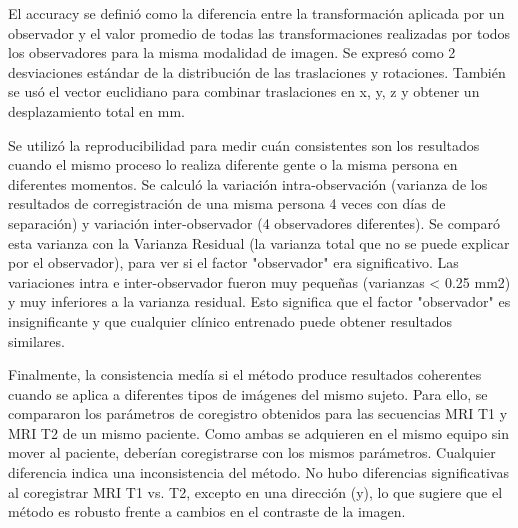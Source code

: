 El accuracy se definió como la diferencia entre la transformación aplicada por un observador y el valor promedio de todas las transformaciones realizadas por todos los observadores para la misma modalidad de imagen.
Se expresó como 2 desviaciones estándar de la distribución de las traslaciones y rotaciones. También se usó el vector euclidiano para combinar traslaciones en x, y, z y obtener un desplazamiento total en mm.

Se utilizó la reproducibilidad para medir cuán consistentes son los resultados cuando el mismo proceso lo realiza diferente gente o la misma persona en diferentes momentos. Se calculó la variación intra-observación (varianza de los resultados de corregistración de una misma persona 4 veces con días de separación) y variación inter-observador (4 observadores diferentes).  Se comparó esta varianza con la Varianza Residual (la varianza total que no se puede explicar por el observador), para ver si el factor "observador" era significativo.
Las variaciones intra e inter-observador fueron muy pequeñas (varianzas < 0.25 mm2) y muy inferiores a la varianza residual. Esto significa que el factor "observador" es insignificante y que cualquier clínico entrenado puede obtener resultados similares.

Finalmente, la consistencia medía si el método produce resultados coherentes cuando se aplica a diferentes tipos de imágenes del mismo sujeto. Para ello, se compararon los parámetros de coregistro obtenidos para las secuencias MRI T1 y MRI T2 de un mismo paciente. Como ambas se adquieren en el mismo equipo sin mover al paciente, deberían coregistrarse con los mismos parámetros. Cualquier diferencia indica una inconsistencia del método.
No hubo diferencias significativas al coregistrar MRI T1 vs. T2, excepto en una dirección (y), lo que sugiere que el método es robusto frente a cambios en el contraste de la imagen.


